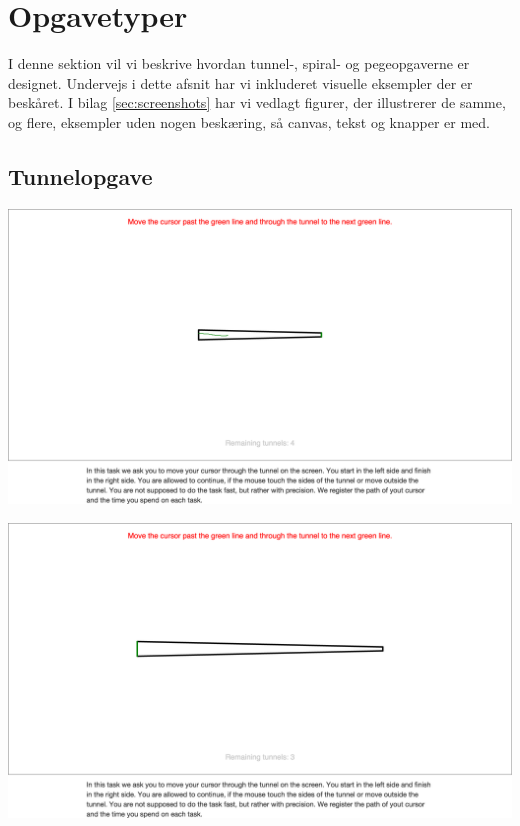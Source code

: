\section*{Opgavetyper}
I denne sektion vil vi beskrive hvordan tunnel-, spiral- og pegeopgaverne er designet. Undervejs i dette afsnit har vi inkluderet visuelle eksempler der er beskåret. I bilag \ref{sec:screenshots} har vi vedlagt figurer, der illustrerer de samme, og flere, eksempler uden nogen beskæring, så canvas, tekst og knapper er med.

\subsection*{Tunnelopgave}
\begin{minipage}{\linewidth}
	\begin{minipage}{\textwidth}
		\centering
		\includegraphics[width=\textwidth, trim = .5cm 23cm .5cm 15cm, clip]{images/screenshots/ex_step_4_tunnel_path}
		\label{fig:ex_tunnel_1}
	\end{minipage}
	\begin{minipage}{\textwidth}
		\centering
		\includegraphics[width=\textwidth, trim = .5cm 22cm .5cm 15cm, clip]{images/screenshots/ex_step_4_tunnel_2}

\end{minipage}
\end{minipage}
